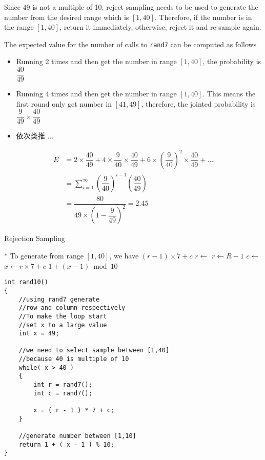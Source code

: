 Since 49 is not a multiple of 10, reject sampling needs to be used to generate the number from the desired range which is $[1, 40]$. Therefore, if the number is in the range $[1, 40]$, return it immediately, otherwise, reject it and re-sample again.

The expected value for the number of calls to \texttt{rand7} can be computed as follows
\begin{itemize}
\item Running 2 times and then get the number in range $[1, 40]$, the probability is $\dfrac{40}{49}$
\item Running 4 times and then get the number in range $[1, 40]$. This means the first round only get number in $[41,49]$, therefore, the jointed probability is $\dfrac{9}{49}\times\dfrac{40}{49}$
\item  依次类推 $\ldots$  
\end{itemize}

\begin{align*}
E &= 2\times \dfrac{40}{49} + 4\times \dfrac{9}{40} \times \dfrac{40}{49} + 6\times \left(\dfrac{9}{40}\right)^{2} \times \dfrac{40}{49} +\ldots \\
  &= \sum\limits_{i=1}^{\infty}\left(\dfrac{9}{40}\right)^{i-1}\left(\dfrac{40}{49}\right) \\
  & = \dfrac{80}{49\times \left(1-\dfrac{9}{49}\right)^2} = 2.45
\end{align*}

\setcounter{algorithm}{0}
\begin{algorithm}[H]
\caption{Rejection Sampling}
\begin{algorithmic}[1]
\Repeat
\State $\ast$ To generate from range $[1,40]$, we have $(r-1)\times 7 +c$
\State $r \gets$ 
\State $r\gets R-1$
\State $c \gets$ 
\State $x \gets r\times 7 + c$
\State \Return $1+(x-1)\bmod 10$
\EndProcedure
\end{algorithmic}
\end{algorithm}


\setcounter{lstlisting}{0}
\begin{lstlisting}[style=customc, caption={Rejection Sampling}]
int rand10()
{
    //using rand7 generate
    //row and column respectively
    //To make the loop start
    //set x to a large value
    int x = 49;

    //we need to select sample between [1,40]
    //because 40 is multiple of 10
    while( x > 40 )
    {
        int r = rand7();
        int c = rand7();

        x = ( r - 1 ) * 7 + c;
    }

    //generate number between [1,10]
    return 1 + ( x - 1 ) % 10;
}
\end{lstlisting}


